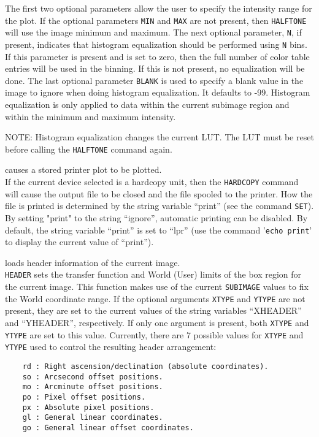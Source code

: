 	The first two optional parameters allow the user to specify the
	intensity range for the plot.
	If the optional parameters {\tt MIN} and
	{\tt MAX} are not present,
	then {\tt HALFTONE} will use the image minimum and maximum.
	The next optional parameter, {\tt N}, if present,
	indicates that histogram equalization should be performed using
	{\tt N} bins.  If this parameter is present and is set to
	zero, then the full number of color table entries will be used
	in the binning.  If this is not present, no equalization will be done.
	The last optional parameter {\tt BLANK} is used to
	specify a blank value in the image to ignore when doing
	histogram equalization.  It defaults to -99.
	Histogram equalization is only applied to data within the
	current subimage region and within the minimum and maximum intensity.
	\par 
	NOTE: Histogram equalization changes the current LUT.  The LUT
	must be reset before calling the {\tt HALFTONE} command again.
\item [{\tt HARDCOPY } --] causes a stored printer plot to be plotted.\\
	If the current device selected is a hardcopy unit, then the
	{\tt HARDCOPY} command will cause the output file to be
	closed and the file spooled to the printer.  How the file is
	printed is determined by the string variable ``print'' (see the
	command {\tt SET}).  By setting "print"
	to the string ``ignore'', automatic printing can be disabled.
	By default, the string variable ``print'' is set to ``lpr''
	(use the command '{\tt echo print}'
	to display the current value of ``print'').
\item [{\tt HEADER [XTYPE [YTYPE]] } --] loads header information of the current image.\\
	{\tt HEADER} sets the transfer function and World (User)
	limits of the box region for the current image.  This function
	makes use of the current {\tt SUBIMAGE}
	values to fix the World coordinate range.  If the optional
	arguments {\tt XTYPE} and {\tt YTYPE} are
	not present, they are set to the current values of the string
	variables ``XHEADER'' and ``YHEADER'', respectively.  If only one
	argument is present, both {\tt XTYPE} and {\tt YTYPE}
	are set to this value.  Currently, there are 7 possible values
	for {\tt XTYPE} and {\tt YTYPE} used to control
	the resulting header arrangement:
	\begin{verbatim}
    rd : Right ascension/declination (absolute coordinates).
    so : Arcsecond offset positions.
    mo : Arcminute offset positions.
    po : Pixel offset positions.
    px : Absolute pixel positions.
    gl : General linear coordinates.
    go : General linear offset coordinates.
	\end{verbatim}
